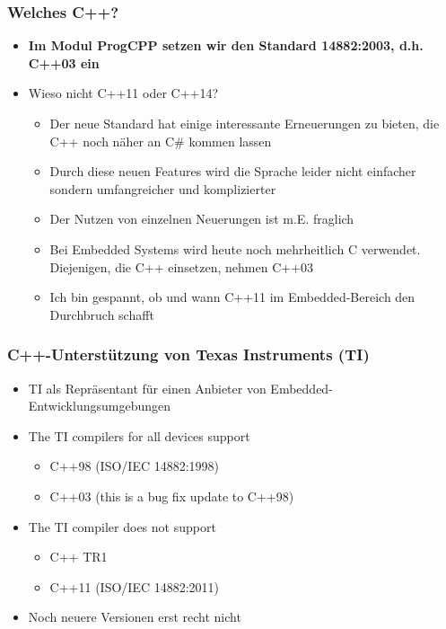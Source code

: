 \subsubsection{Welches C++?\hfill}
\label{sec:Welches C++?}
\begin{itemize}
	\item \textbf{Im Modul ProgCPP setzen wir den Standard 14882:2003, d.h. C++03 ein}
	\item Wieso nicht C++11 oder C++14?
	\begin{itemize}
		\item Der neue Standard hat einige interessante Erneuerungen zu bieten, die C++ noch näher an C\# kommen lassen
		\item Durch diese neuen Features wird die Sprache leider nicht einfacher sondern umfangreicher und komplizierter
		\item Der Nutzen von einzelnen Neuerungen ist m.E. fraglich
		\item Bei Embedded Systems wird heute noch mehrheitlich C verwendet. Diejenigen, die C++ einsetzen, nehmen C++03
		\item Ich bin gespannt, ob und wann C++11 im Embedded-Bereich den Durchbruch schafft
	\end{itemize}
\end{itemize}

\subsubsection{C++-Unterstützung von Texas Instruments (TI)\hfill}
\label{sec:C++-Unterstuetzung von Texas Instruments (TI)}
\begin{itemize}
	\item TI als Repräsentant für einen Anbieter von Embedded-Entwicklungsumgebungen
	\item The TI compilers for all devices support
	\begin{itemize}
		\item C++98 (ISO/IEC 14882:1998)
		\item C++03 (this is a bug fix update to C++98)
	\end{itemize}
	\item The TI compiler does not support
	\begin{itemize}
		\item C++ TR1
		\item C++11 (ISO/IEC 14882:2011)
	\end{itemize}
	\item Noch neuere Versionen erst recht nicht
\end{itemize}

